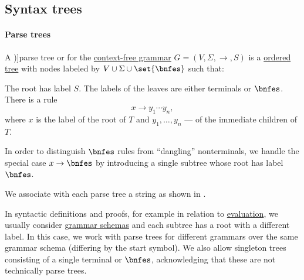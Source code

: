 \subsection{Syntax trees}\label{subsec:syntax_trees}

\paragraph{Parse trees}

\begin{definition}\label{def:parse_tree}
  A \term[ru=дерево вывода (\cite[81]{Гладкий1973Языки})]{parse tree} or  for the \hyperref[def:chomsky_hierarchy/context_free]{context-free grammar} \( G = (V, \Sigma, \to, S) \) is a \hyperref[def:ordered_tree]{ordered tree} with nodes labeled by \( V \cup \Sigma \cup \set{ \bnfes } \) such that:
  \begin{thmenum}
     The root has label \( S \).
     The labels of the leaves are either terminals or \( \bnfes \).
     There is a rule
    \begin{equation*}
      x \to y_1 \cdots y_n,
    \end{equation*}
    where \( x \) is the label of the root of \( T \) and \( y_1, \ldots, y_n \) --- of the immediate children of \( T \).

    In order to distinguish \( \bnfes \) rules from \enquote{dangling} nonterminals, we handle the special case \( x \to \bnfes \) by introducing a single subtree whose root has label \( \bnfes \).
  \end{thmenum}
\end{definition}
\begin{comments}
  \item We associate with each parse tree a string as shown in .
\end{comments}

\begin{remark}\label{rem:parse_tree_roots}
  In syntactic definitions and proofs, for example in relation to \hyperref[con:evaluation]{evaluation}, we usually consider \hyperref[def:formal_grammar/schema]{grammar schemas} and each subtree has a root with a different label. In this case, we work with parse trees for different grammars over the same grammar schema (differing by the start symbol). We also allow singleton trees consisting of a single terminal or \( \bnfes \), acknowledging that these are not technically parse trees.
\end{remark}

